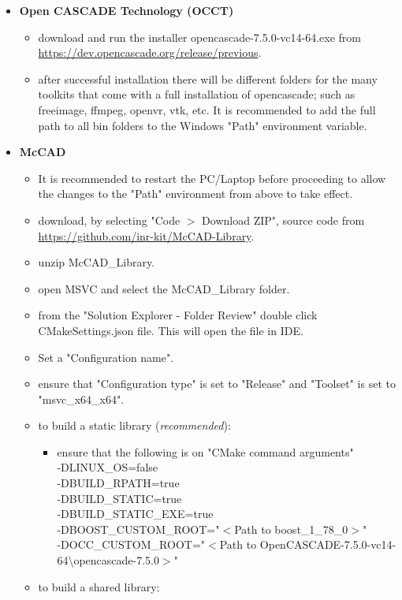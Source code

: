 \documentclass[12pt, a4paper, titlepage]{article}
\begin{document}
\begin{itemize}
      \item \textbf{Open CASCADE Technology (OCCT)}
	  \begin{itemize}
		\item download and run the installer opencascade-7.5.0-vc14-64.exe from \url{https://dev.opencascade.org/release/previous}.
		\item after successful installation there will be different folders for the many toolkits that come with a full installation of opencascade; such as freeimage, ffmpeg, openvr, vtk, etc. It is recommended to add the full path to all bin folders to the Windows "Path" environment variable.
	  \end{itemize}
	  \item \textbf{McCAD}
	  \begin{itemize}
	  	\item It is recommended to restart the PC/Laptop before proceeding to allow the changes to the "Path" environment from above to take effect. 
		\item download, by selecting "Code $>$ Download ZIP", source code from \\\url{https://github.com/inr-kit/McCAD-Library}.
		\item unzip McCAD\_Library.
		\item open MSVC and select the McCAD\_Library folder.
		\item from the "Solution Explorer - Folder Review" double click CMakeSettings.json file. This will open the file in IDE. \item Set a "Configuration name". 
		\item ensure that "Configuration type" is set to "Release" and "Toolset" is set to "msvc\_x64\_x64".
		\item to build a static library (\emph{recommended}):
		  \begin{itemize}
		  	\item ensure that the following is on "CMake command arguments" \\-DLINUX\_OS=false \\-DBUILD\_RPATH=true \\-DBUILD\_STATIC=true \\-DBUILD\_STATIC\_EXE=true \\-DBOOST\_CUSTOM\_ROOT="$<$Path to boost\_1\_78\_0$>$" \\-DOCC\_CUSTOM\_ROOT="$<$Path to OpenCASCADE-7.5.0-vc14-64\textbackslash opencascade-7.5.0$>$"
		  \end{itemize}
		\item to build a shared library:

\end{itemize}
\end{itemize}
\end{document}
